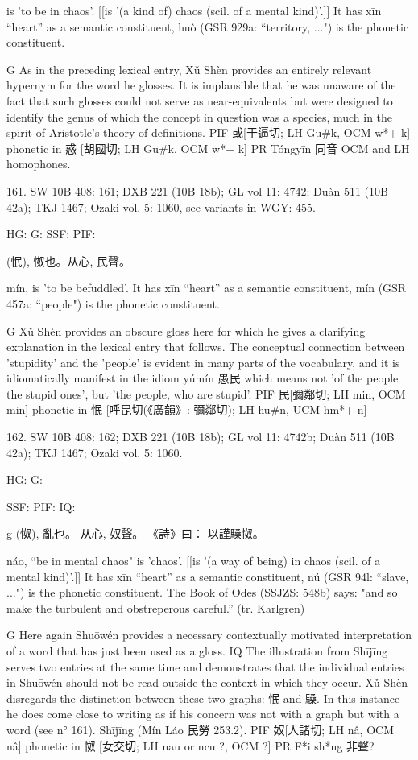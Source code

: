 is 'to be in chaos'. [[is '(a kind of) chaos (scil. of a mental kind)'.]] It has xīn ``heart'' as a semantic constituent,
huò (GSR 929a: ``territory, ...") is the phonetic constituent.

G     As in the preceding lexical entry, Xǔ Shèn provides an entirely relevant hypernym for the word he glosses. It is implausible that he was unaware of the fact that such glosses could not serve as near-equivalents but were designed to identify the genus of which the concept in question was a species, much in the spirit of Aristotle's theory of definitions.
PIF     或[于逼切; LH Gu\#k, OCM w*+ k] phonetic in 惑 [胡國切; LH Gu\#k, OCM w*+ k]
PR	Tóngyīn 同音 OCM and LH homophones.

161. SW 10B 408: 161; DXB 221 (10B 18b); GL vol 11: 4742; Duàn 511 (10B 42a); TKJ 1467; Ozaki vol. 5: 1060, see
variants in WGY: 455.


HG:
G: SSF: PIF:

  (怋),
怓也。从心, 民聲。


mín,
is 'to be befuddled'.
It has xīn ``heart'' as a semantic constituent,
mín (GSR 457a: ``people") is the phonetic constituent.

G   Xǔ Shèn provides an obscure gloss here for which he gives a clarifying explanation in the lexical entry that follows. The conceptual connection between 'stupidity' and the 'people' is evident in many parts of the vocabulary, and it is idiomatically manifest in the idiom yúmín 愚民 which means not 'of the people the stupid ones', but 'the people, who are stupid'.
PIF 民[彌鄰切; LH min, OCM min] phonetic in 怋 [呼昆切(《廣韻》: 彌鄰切); LH hu\#n, UCM hm*+ n]



162. SW 10B 408: 162; DXB 221 (10B 18b); GL vol 11: 4742b; Duàn 511 (10B 42a); TKJ 1467; Ozaki vol. 5: 1060.


HG:
G:

SSF: PIF: IQ:

g (怓),
亂也。
从心, 奴聲。
《詩》曰： 以謹䮣怓。


náo, ``be in mental chaos"
is 'chaos'. [[is '(a way of being) in chaos (scil. of a mental kind)'.]]
It has xīn ``heart'' as a semantic constituent,
nú (GSR 94l: ``slave, ...") is the phonetic constituent.
The Book of Odes (SSJZS: 548b) says:
"and so make the turbulent and obstreperous careful.'' (tr. Karlgren)

G Here again Shuōwén provides a necessary contextually motivated interpretation of a word that has just been used as a gloss.
IQ The illustration from Shījīng serves two entries at the same time and demonstrates that the individual entries in Shuōwén should not be read outside the context in which they occur. Xǔ Shèn disregards the distinction between these two graphs: 怋 and 䮣. In this instance he does come close to writing as if his concern was not with a graph but with a word (see n° 161).
Shījīng (Mín Láo 民勞 253.2).
PIF     奴[人諸切; LH nâ, OCM nâ] phonetic in 怓 [女交切; LH nau or ncu ?, OCM ?]
PR	F*i sh*ng 非聲?

